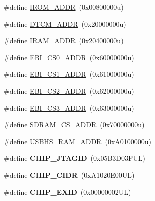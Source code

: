 \begin{DoxyCompactItemize}
\item 
\#define \mbox{\hyperlink{group__SAME70Q21__definitions_ga694212ffb8c2786bacee3d0ad6020bda}{I\+R\+O\+M\+\_\+\+A\+D\+DR}}~(0x00800000u)
\item 
\#define \mbox{\hyperlink{group__SAME70Q21__definitions_ga26626a425f7ebb3a0c2dbc276f0d9f78}{D\+T\+C\+M\+\_\+\+A\+D\+DR}}~(0x20000000u)
\item 
\#define \mbox{\hyperlink{group__SAME70Q21__definitions_gaae45ac2ef16942159481c767ac4805cf}{I\+R\+A\+M\+\_\+\+A\+D\+DR}}~(0x20400000u)
\item 
\#define \mbox{\hyperlink{group__SAME70Q21__definitions_ga9bcbb97ddae3b2cc5e2c9613d33f66b4}{E\+B\+I\+\_\+\+C\+S0\+\_\+\+A\+D\+DR}}~(0x60000000u)
\item 
\#define \mbox{\hyperlink{group__SAME70Q21__definitions_gaaddd9fdbbc77c9aced5308819f502a26}{E\+B\+I\+\_\+\+C\+S1\+\_\+\+A\+D\+DR}}~(0x61000000u)
\item 
\#define \mbox{\hyperlink{group__SAME70Q21__definitions_ga058a35f9991487dc2dd12ada792d0730}{E\+B\+I\+\_\+\+C\+S2\+\_\+\+A\+D\+DR}}~(0x62000000u)
\item 
\#define \mbox{\hyperlink{group__SAME70Q21__definitions_gad66ebdd0fc33ec3cf85dbaa14bbf05d9}{E\+B\+I\+\_\+\+C\+S3\+\_\+\+A\+D\+DR}}~(0x63000000u)
\item 
\#define \mbox{\hyperlink{group__SAME70Q21__definitions_ga61b7db25daf759c2a2beb6e5a0b57a84}{S\+D\+R\+A\+M\+\_\+\+C\+S\+\_\+\+A\+D\+DR}}~(0x70000000u)
\item 
\#define \mbox{\hyperlink{group__SAME70Q21__definitions_ga509eeb3745bd4057d342dd132dd2cecf}{U\+S\+B\+H\+S\+\_\+\+R\+A\+M\+\_\+\+A\+D\+DR}}~(0x\+A0100000u)
\item 
\mbox{\label{group__SAME70Q21__definitions_gaa614519778eec0df55d3eeab3223e3f6}} 
\#define {\bfseries C\+H\+I\+P\+\_\+\+J\+T\+A\+G\+ID}~(0x05\+B3\+D03\+F\+U\+L)
\item 
\mbox{\label{group__SAME70Q21__definitions_ga1e1ae44dd9269a8a98c1d7e7a60e9fbd}} 
\#define {\bfseries C\+H\+I\+P\+\_\+\+C\+I\+DR}~(0x\+A1020\+E00\+U\+L)
\item 
\mbox{\label{group__SAME70Q21__definitions_ga35123717aa86b76bb6b73cf3adc4c2e6}} 
\#define {\bfseries C\+H\+I\+P\+\_\+\+E\+X\+ID}~(0x00000002\+U\+L)
\item 
\mbox{\label{group__SAME70Q21__definitions_ga0e868bf27426399dfdcb3a9dfc3733c4}} 

\end{DoxyCompactItemize}
